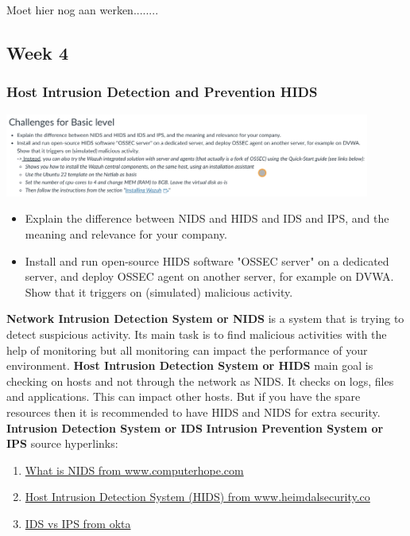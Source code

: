 \documentclass[12pt, letterpaper]{article}
\begin{document}
Moet hier nog aan werken........
\newpage
\subsection{Week 4}
\subsubsection{Host Intrusion Detection and Prevention HIDS}
\includegraphics[width=0.9\textwidth]{fotos/Week 4/Host Intrusion Detection and Prevention HIDS.jpeg}
\begin{itemize}
    \item Explain the difference between NIDS and HIDS and IDS and IPS, and the meaning and relevance for your company.
    \item Install and run open-source HIDS software "OSSEC server" on a dedicated server, and deploy OSSEC agent on another server, for example on DVWA. Show that it triggers on (simulated) malicious activity. 

\end{itemize}
\textbf{Network Intrusion Detection System or NIDS} is a system that is trying to detect suspicious activity. Its main task is to find malicious activities with the help of monitoring but all monitoring can impact the performance of your environment.
\hfill\break
\textbf{Host Intrusion Detection System or HIDS} main goal is checking on hosts and not through the network as NIDS. It checks on logs, files and applications. This can impact other hosts. But if you have the spare resources then it is recommended to have HIDS and NIDS for extra security.
\hfill\break
\textbf{Intrusion Detection System or IDS}
\hfill\break
\textbf{Intrusion Prevention System or IPS}
\hfill\break
\hfill\break
source hyperlinks:
\begin{enumerate}
    \item \href{https://www.computerhope.com/jargon/n/nids.htm}{What is NIDS from www.computerhope.com}
    \item \href{https://heimdalsecurity.com/blog/host-intrusion-detection-system-hids/}{Host Intrusion Detection System (HIDS) from www.heimdalsecurity.co}
    \item \href{https://www.okta.com/identity-101/ids-vs-ips/}{IDS vs IPS from okta }
\end{enumerate}
\end{document}
